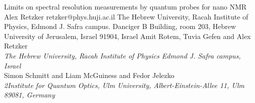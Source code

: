 \begin{conf-abstract}[]
{Limits on spectral resolution measurements by quantum probes for nano NMR}
{\color{blue} Alex Retzker}
{retzker@phys.huji.ac.il}
{The Hebrew University, Racah Institute of Physics, Edmond J. Safra campus. Danciger B Building, room 203, Hebrew University of Jerusalem, Israel 91904, Israel}
{{\color{blue}Amit Rotem, Tuvia Gefen and Alex Retzker}\\ \textit{The Hebrew University, Racah Institute of Physics Edmond J. Safra campus, Israel}\\ 
{\color{blue}Simon Schmitt and Liam McGuiness and Fedor Jelezko}\\ \textit{ 2Institute for Quantum Optics, Ulm University, Albert-Einstein-Allee 11, Ulm 89081, Germany}\\ 
\decofourleft \decofourright}





\printbibliography[heading=none]

\end{conf-abstract}

